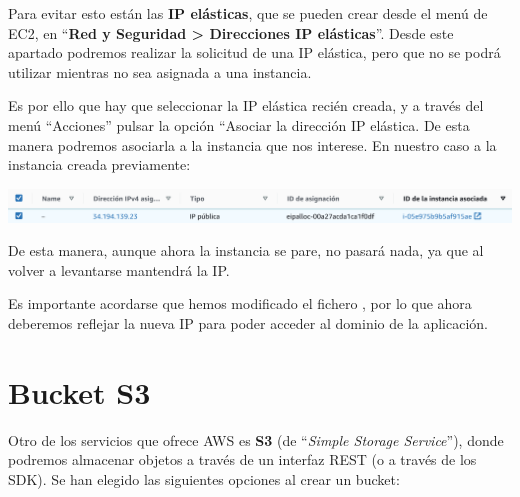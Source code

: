 \documentclass{\ClassPath/viu-tfm-template}
\begin{document}
Para evitar esto están las \textbf{IP elásticas}, que se pueden crear desde el menú de EC2, en “\textbf{Red y Seguridad > Direcciones IP elásticas}”. Desde este apartado podremos realizar la solicitud de una IP elástica, pero que no se podrá utilizar mientras no sea asignada a una instancia.

Es por ello que hay que seleccionar la IP elástica recién creada, y a través del menú “Acciones” pulsar la opción “Asociar la dirección IP elástica. De esta manera podremos asociarla a la instancia que nos interese. En nuestro caso a la instancia creada previamente:

\begin{center}
    \includegraphics[frame,width=\linewidth]{img/ip_elastica.png}
\end{center}

De esta manera, aunque ahora la instancia se pare, no pasará nada, ya que al volver a levantarse mantendrá la IP.

Es importante acordarse que hemos modificado el fichero , por lo que ahora deberemos reflejar la nueva IP para poder acceder al dominio de la aplicación.


\chapter{Bucket S3}

Otro de los servicios que ofrece AWS es \textbf{S3} (de “\textit{Simple Storage Service}”), donde podremos almacenar objetos a través de un interfaz REST (o a través de los SDK). Se han elegido las siguientes opciones al crear un bucket:

\end{document}
